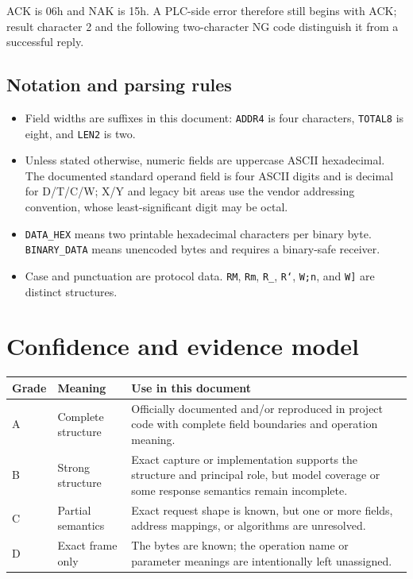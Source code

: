 \documentclass[10pt,letterpaper]{article}
\begin{document}
ACK is 06h and NAK is 15h. A PLC-side error therefore still begins with ACK; result character 2 and the following two-character NG code distinguish it from a successful reply.

\subsection{Notation and parsing rules}
\begin{itemize}
\item Field widths are suffixes in this document: \texttt{ADDR4} is four characters, \texttt{TOTAL8} is eight, and \texttt{LEN2} is two.
\item Unless stated otherwise, numeric fields are uppercase ASCII hexadecimal. The documented standard operand field is four ASCII digits and is decimal for D/T/C/W; X/Y and legacy bit areas use the vendor addressing convention, whose least-significant digit may be octal.
\item \texttt{DATA\_HEX} means two printable hexadecimal characters per binary byte. \texttt{BINARY\_DATA} means unencoded bytes and requires a binary-safe receiver.
\item Case and punctuation are protocol data. \texttt{RM}, \texttt{Rm}, \texttt{R\_}, \texttt{R`}, \texttt{W;n}, and \texttt{W]} are distinct structures.
\end{itemize}

\section{Confidence and evidence model}
\begin{longtable}{@{}p{1.2cm}p{4.0cm}p{10.0cm}@{}}
\toprule
Grade & Meaning & Use in this document \\
\midrule
A & Complete structure & Officially documented and/or reproduced in project code with complete field boundaries and operation meaning. \\
B & Strong structure & Exact capture or implementation supports the structure and principal role, but model coverage or some response semantics remain incomplete. \\
C & Partial semantics & Exact request shape is known, but one or more fields, address mappings, or algorithms are unresolved. \\
D & Exact frame only & The bytes are known; the operation name or parameter meanings are intentionally left unassigned. \\
\bottomrule
\end{longtable}
\end{document}
